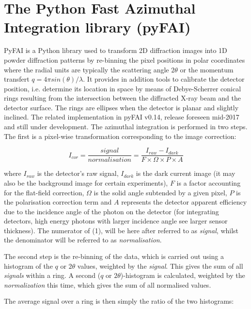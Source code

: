 \documentclass[preprint]{iucr}              %
\begin{document}
\section{The Python Fast Azimuthal Integration library (pyFAI)}

PyFAI is a Python \cite{python} library used to transform 2D diffraction images into
1D powder diffraction patterns by re-binning the pixel positions in polar
coordinates where the radial units are typically the scattering angle  
$2\theta$ or the momentum transfert $q=4\pi sin(\theta)/\lambda$.
It provides in addition tools to calibrate the detector position, i.e. determine
its location in space by means of Debye-Scherrer conical rings resulting from
the intersection between the diffracted X-ray beam and the detector
surface. The rings are ellipses when the detector is planar and slightly
inclined.
The related implementation in pyFAI v0.14, release foreseen mid-2017 and still
under development. 
The azimuthal integration is performed in two steps. 
The first is a pixel-wise
transformation corresponding to the image correction:

\begin{equation}
I_{cor} = \frac{signal}{normalisation}  = \frac{I_{raw} - I_{dark}}{F \times
\Omega \times P \times A } 
\end{equation}

where $I_{raw}$ is the detector's raw signal, $I_{dark}$ is the dark current
image (it may also be the background image for certain experiments), $F$ is a 
factor accounting for the flat-field correction, $\Omega$ is the solid
angle subtended by a given pixel, $P$ is the polarisation correction term
and $A$ represents the detector apparent efficiency due to the incidence angle
of the photon on the detector (for integrating detectors, high energy
photons with larger incidence angle see larger sensor thickness).
The numerator of (1), will be here after referred to as
\textit{signal}, whilst the denominator will be referred to as
\textit{normalisation}.

The second step is the re-binning of the data, which is carried out 
using a histogram of the $q$ or $2\theta$ values, weighted by the
\textit{signal}.
This gives the sum of all \textit{signals} within a ring.
A second ($q$ or $2\theta$)-histogram is calculated, weighted
by the \textit{normalization} this time, which gives the sum of all
normalised values.

The average signal over a ring is then simply the ratio of the two histograms:
\end{document}
